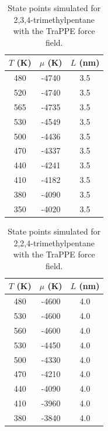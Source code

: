 \documentclass[journal=jctc,manuscript=article]{achemso}
\begin{document}
\begin{table}[htb!]
	\caption{State points simulated for 2,3,4-trimethylpentane with the TraPPE force field.}
	\begin{center}
		\begin{tabular}{|c|c|c|}
			\hline
			$T$ (K) & $\mu$ (K) & $L$ (nm) \\ \hline
			480	&	-4740	&	3.5	\\
			520	&	-4740	&	3.5	\\
			565	&	-4735	&	3.5	\\
			530	&	-4549	&	3.5	\\
			500	&	-4436	&	3.5	\\
			470	&	-4337	&	3.5	\\
			440	&	-4241	&	3.5	\\
			410	&	-4182	&	3.5	\\
			380	&	-4090	&	3.5	\\
			350	&	-4020	&	3.5	\\
			\hline
		\end{tabular}
	\end{center}
\end{table}

\begin{table}[htb!]
	\caption{State points simulated for 2,2,4-trimethylpentane with the TraPPE force field.}
	\begin{center}
		\begin{tabular}{|c|c|c|}
			\hline
			$T$ (K) & $\mu$ (K) & $L$ (nm) \\ \hline
			480	&	-4600	&	4.0	\\
			530	&	-4600	&	4.0	\\
			560	&	-4600	&	4.0	\\
			530	&	-4450	&	4.0	\\
			500	&	-4330	&	4.0	\\
			470	&	-4210	&	4.0	\\
			440	&	-4090	&	4.0	\\
			410	&	-3960	&	4.0	\\
			380	&	-3840	&	4.0	\\
			\hline
		\end{tabular}
	\end{center}
\end{table}
\end{document}
